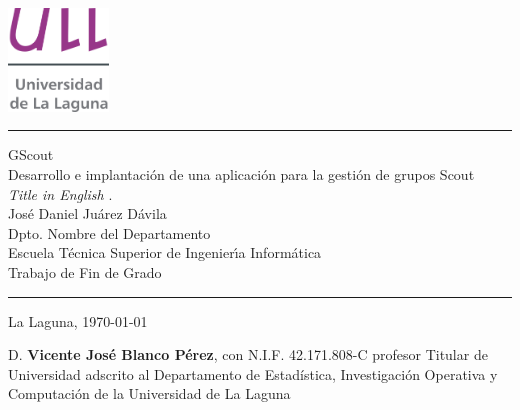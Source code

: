 \documentclass[spanish,a4paper,11pt,twoside]{report}
\begin{document}

\pagestyle{empty}
\thispagestyle{empty}


\newcommand{\HRule}{\rule{\linewidth}{1mm}}
\setlength{\parindent}{0mm}
\setlength{\parskip}{0mm}

\begin{center}
\includegraphics[width=0.2\textwidth]{images/logotipo-secundario-ULL}\\[0.25cm]
\end{center}

\HRule
\begin{flushright}
        {\Huge GScout} \\[2.5mm] 
        {\Huge Desarrollo e implantación de una 
        aplicación para la gestión de grupos Scout} \\[2.5mm]
        {\Large \textit{Title in English} .} \\[5mm]
        {\Large José Daniel Juárez Dávila} \\[5mm]
        Dpto. Nombre del Departamento \\[5mm]
        Escuela T\'ecnica Superior de Ingenier\'{\i}a Inform\'atica \\[5mm]
        
        Trabajo de Fin de Grado \\
\end{flushright}
\HRule
{}
\begin{center}
  \Large La Laguna, \today 
\end{center}

\setlength{\parindent}{5mm}

\cleardoublepage
\thispagestyle{empty}

D. {\bf Vicente José Blanco Pérez}, con N.I.F. 42.171.808-C 
profesor
Titular de Universidad 
adscrito al Departamento 
de Estadística, Investigación Operativa y Computación
de la Universidad de La Laguna
\end{document}
